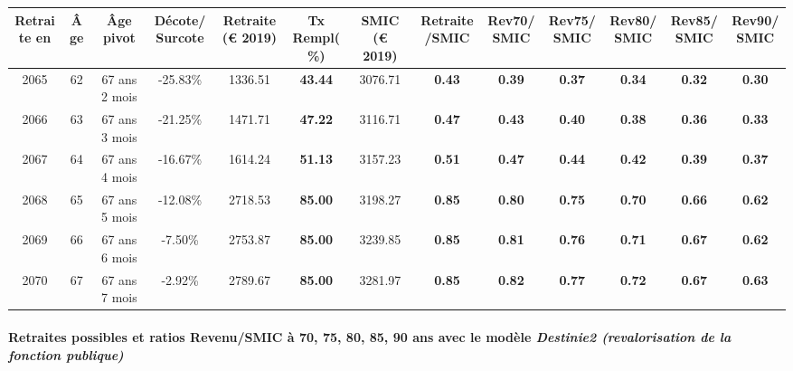 { \scriptsize \begin{center} 
\begin{tabular}[htb]{|c|c||c|c||c|c||c||c|c|c|c|c|c|} 
\hline 
 Retraite en &  Âge &  Âge pivot &  Décote/Surcote &  Retraite (\euro{} 2019) &  Tx Rempl(\%) &  SMIC (\euro{} 2019) &  Retraite/SMIC &  Rev70/SMIC &  Rev75/SMIC &  Rev80/SMIC &  Rev85/SMIC &  Rev90/SMIC \\ 
\hline \hline 
 2065 &  62 &  67 ans 2 mois &  -25.83\% &  1336.51 &  {\bf 43.44} &  3076.71 &  {\bf {\color{red} 0.43}} &  {\bf {\color{red} 0.39}} &  {\bf {\color{red} 0.37}} &  {\bf {\color{red} 0.34}} &  {\bf {\color{red} 0.32}} &  {\bf {\color{red} 0.30}} \\ 
\hline 
 2066 &  63 &  67 ans 3 mois &  -21.25\% &  1471.71 &  {\bf 47.22} &  3116.71 &  {\bf {\color{red} 0.47}} &  {\bf {\color{red} 0.43}} &  {\bf {\color{red} 0.40}} &  {\bf {\color{red} 0.38}} &  {\bf {\color{red} 0.36}} &  {\bf {\color{red} 0.33}} \\ 
\hline 
 2067 &  64 &  67 ans 4 mois &  -16.67\% &  1614.24 &  {\bf 51.13} &  3157.23 &  {\bf {\color{red} 0.51}} &  {\bf {\color{red} 0.47}} &  {\bf {\color{red} 0.44}} &  {\bf {\color{red} 0.42}} &  {\bf {\color{red} 0.39}} &  {\bf {\color{red} 0.37}} \\ 
\hline 
 2068 &  65 &  67 ans 5 mois &  -12.08\% &  2718.53 &  {\bf 85.00} &  3198.27 &  {\bf {\color{red} 0.85}} &  {\bf {\color{red} 0.80}} &  {\bf {\color{red} 0.75}} &  {\bf {\color{red} 0.70}} &  {\bf {\color{red} 0.66}} &  {\bf {\color{red} 0.62}} \\ 
\hline 
 2069 &  66 &  67 ans 6 mois &  -7.50\% &  2753.87 &  {\bf 85.00} &  3239.85 &  {\bf {\color{red} 0.85}} &  {\bf {\color{red} 0.81}} &  {\bf {\color{red} 0.76}} &  {\bf {\color{red} 0.71}} &  {\bf {\color{red} 0.67}} &  {\bf {\color{red} 0.62}} \\ 
\hline 
 2070 &  67 &  67 ans 7 mois &  -2.92\% &  2789.67 &  {\bf 85.00} &  3281.97 &  {\bf {\color{red} 0.85}} &  {\bf {\color{red} 0.82}} &  {\bf {\color{red} 0.77}} &  {\bf {\color{red} 0.72}} &  {\bf {\color{red} 0.67}} &  {\bf {\color{red} 0.63}} \\ 
\hline 
\hline 
\end{tabular} 
\end{center} } 
\paragraph{Retraites possibles et ratios Revenu/SMIC à 70, 75, 80, 85, 90 ans avec le modèle \emph{Destinie2 (revalorisation de la fonction publique)}}  
 
